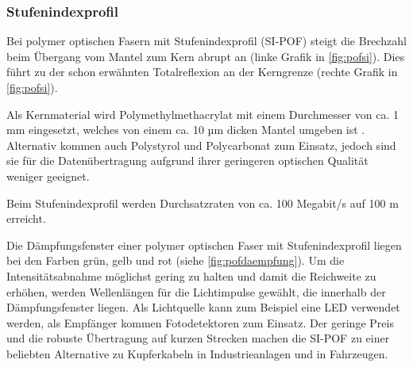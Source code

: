 \subsubsection{Stufenindexprofil}

Bei polymer optischen Fasern mit Stufenindexprofil (SI-POF) steigt die Brechzahl
beim Übergang vom Mantel zum Kern abrupt an (linke Grafik in
\autoref{fig:pofsi}). Dies führt zu der schon erwähnten Totalreflexion an der
Kerngrenze (rechte Grafik in \autoref{fig:pofsi}).

Als Kernmaterial wird Polymethylmethacrylat mit einem Durchmesser von ca. 1 mm
eingesetzt, welches von einem ca. 10 µm dicken Mantel umgeben ist
\cite{pofacsi}. Alternativ kommen auch Polystyrol und Polycarbonat zum Einsatz,
jedoch sind sie für die Datenübertragung aufgrund ihrer geringeren optischen
Qualität weniger geeignet.

Beim Stufenindexprofil werden Durchsatzraten von ca. 100 Megabit/s auf 100 m
erreicht.

Die Dämpfungsfenster einer polymer optischen Faser mit Stufenindexprofil liegen
bei den Farben grün, gelb und rot (siehe \autoref{fig:pofdaempfung}). Um die
Intensitätsabnahme möglichst gering zu halten und damit die Reichweite zu
erhöhen, werden Wellenlängen für die Lichtimpulse gewählt, die innerhalb der
Dämpfungsfenster liegen. Als Lichtquelle kann zum Beispiel eine LED verwendet
werden, als Empfänger kommen Fotodetektoren zum Einsatz. Der geringe Preis und
die robuste Übertragung auf kurzen Strecken machen die SI-POF zu einer beliebten
Alternative zu Kupferkabeln in Industrieanlagen und in Fahrzeugen. \cite{poflee}


